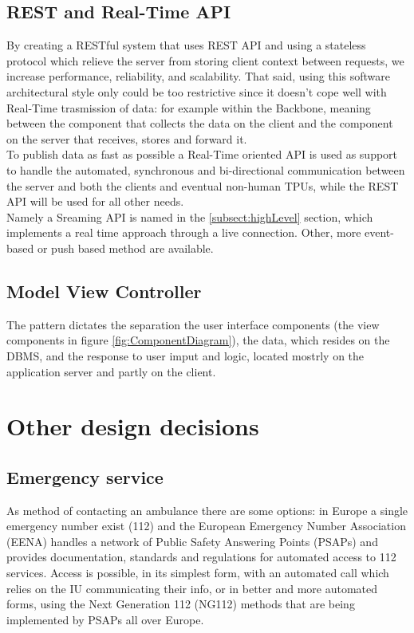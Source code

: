 \subsection{REST and Real-Time API}
\label{subsect:API}
By creating a RESTful system that uses REST API and using a stateless protocol which relieve the server from storing client context between requests, we increase performance, reliability, and scalability. That said, using this software architectural style only could be too restrictive since it doesn't cope well with Real-Time trasmission of data: for example within the Backbone, meaning between the component that collects the data on the client and the component on the server that receives, stores and forward it. \\
To publish data as fast as possible a Real-Time oriented API is used as support to handle the automated, synchronous and bi-directional communication between the server and both the clients and eventual non-human TPUs, while the REST API will be used for all other needs. \\
Namely a Sreaming API is named in the \ref{subsect:highLevel} section, which implements a real time approach through a live connection. Other, more event-based or push based method are available.

\subsection{Model View Controller}
The pattern dictates the separation the user interface components (the view components in figure \ref{fig:ComponentDiagram}), the data, which resides on the DBMS, and the response to user imput and logic, located mostrly on the application server and partly on the client.
\section{Other design decisions}
\subsection{Emergency service}
\label{subsect:ES}
As method of contacting an ambulance there are some options: in Europe a single emergency number exist (112) and the European Emergency Number Association (EENA) handles a network of Public Safety Answering Points (PSAPs) and provides documentation, standards and regulations for automated access to 112 services. Access is possible, in its simplest form, with an automated call which relies on the IU communicating their info, or in better and more automated forms, using the Next Generation 112 (NG112) methods that are being implemented by PSAPs all over Europe.

